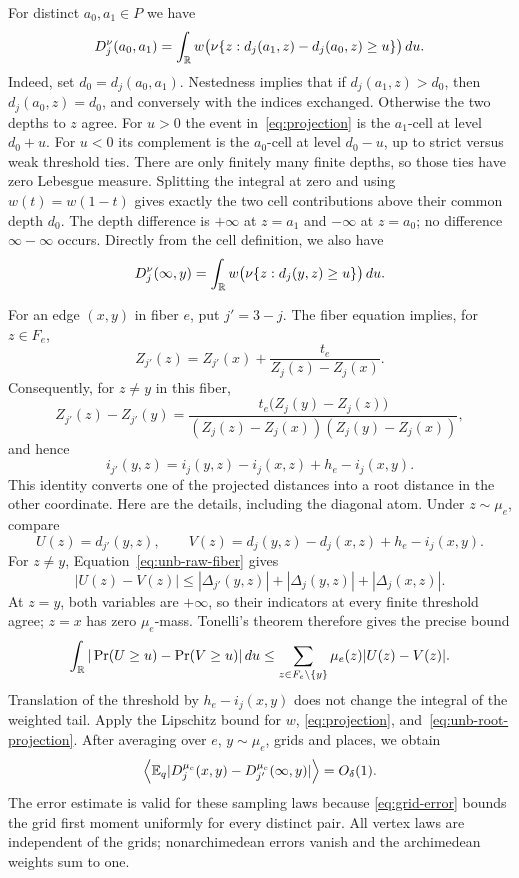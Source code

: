For distinct $a_0,a_1\in P$ we have
\begin{equation}\label{eq:projection}
 D_j^\nu(a_0,a_1)=\int_{\mathbb R}
 w\bigl(\nu\{z:d_j(a_1,z)-d_j(a_0,z)\ge u\}\bigr)\,du.
\end{equation}
Indeed, set $d_0=d_j(a_0,a_1)$. Nestedness implies that if
$d_j(a_1,z)>d_0$, then $d_j(a_0,z)=d_0$, and conversely with the
indices exchanged. Otherwise the two depths to $z$ agree.
For $u>0$ the event in~\eqref{eq:projection} is the $a_1$-cell at
level $d_0+u$. For $u<0$ its complement is the $a_0$-cell at level
$d_0-u$, up to strict versus weak threshold ties. There are only
finitely many finite depths, so those ties have zero Lebesgue measure.
Splitting the integral at zero and using $w(t)=w(1-t)$ gives exactly
the two cell contributions above their common depth $d_0$.
The depth difference is $+\infty$ at $z=a_1$ and $-\infty$ at
$z=a_0$; no difference $\infty-\infty$ occurs. Directly from the
cell definition, we also have
\begin{equation}\label{eq:unb-root-projection}
 D_j^\nu(\infty,y)=\int_{\mathbb R}
 w\bigl(\nu\{z:d_j(y,z)\ge u\}\bigr)\,du.
\end{equation}

For an edge $(x,y)$ in fiber $e$, put $j'=3-j$. The fiber equation
implies, for $z\in F_e$,
\[
 Z_{j'}(z)=Z_{j'}(x)+\frac{t_e}{Z_j(z)-Z_j(x)}.
\]
Consequently, for $z\ne y$ in this fiber,
\[
 Z_{j'}(z)-Z_{j'}(y)
 =\frac{t_e\bigl(Z_j(y)-Z_j(z)\bigr)}
 {(Z_j(z)-Z_j(x))(Z_j(y)-Z_j(x))},
\]
and hence
\begin{equation}\label{eq:unb-raw-fiber}
 i_{j'}(y,z)=i_j(y,z)-i_j(x,z)+h_e-i_j(x,y).
\end{equation}
This identity converts one of the projected distances into a root
distance in the other coordinate. Here are the details, including the
diagonal atom. Under $z\sim\mu_e$, compare
\[
 U(z)=d_{j'}(y,z),\qquad
 V(z)=d_j(y,z)-d_j(x,z)+h_e-i_j(x,y).
\]
For $z\ne y$, Equation~\eqref{eq:unb-raw-fiber} gives
\[
 |U(z)-V(z)|\le
 |\Delta_{j'}(y,z)|+|\Delta_j(y,z)|+|\Delta_j(x,z)|.
\]
At $z=y$, both variables are $+\infty$, so their indicators at every
finite threshold agree; $z=x$ has zero $\mu_e$-mass. Tonelli's theorem
therefore gives the precise bound
\[
 \int_{\mathbb R}|\Pr(U\ge u)-\Pr(V\ge u)|\,du
 \le \sum_{z\in F_e\setminus\{y\}}\mu_e(z)|U(z)-V(z)|.
\]
Translation of the threshold by $h_e-i_j(x,y)$ does not change the
integral of the weighted tail. Apply the Lipschitz bound for $w$,
\eqref{eq:projection}, and~\eqref{eq:unb-root-projection}. After
averaging over $e$, $y\sim\mu_e$, grids and places, we obtain
\[
 \left\langle \mathbb E_q
 |D_j^{\mu_e}(x,y)-D_{j'}^{\mu_e}(\infty,y)|\right\rangle=O_\delta(1).
\]
The error estimate is valid for these sampling laws because
\eqref{eq:grid-error} bounds the grid first moment uniformly for
every distinct pair. All vertex laws are independent of the grids;
nonarchimedean errors vanish and the archimedean weights sum to one.


